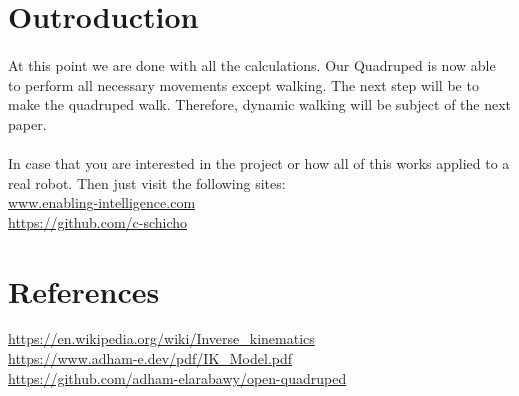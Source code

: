\documentclass{article}
\begin{document}






    \section{Outroduction}
    \paragraph{}
    At this point we are done with all the calculations. Our Quadruped is now able to perform all necessary movements except walking. The next step will be to make the quadruped walk. Therefore, dynamic walking will be subject of the next paper.
    \paragraph{}
    In case that you are interested in the project or how all of this works applied to a real robot. Then just visit the following sites: \\
    \url{www.enabling-intelligence.com} \\
    \url{https://github.com/c-schicho}



    \section{References}
    \url{https://en.wikipedia.org/wiki/Inverse_kinematics} \\
    \url{https://www.adham-e.dev/pdf/IK_Model.pdf} \\
    \url{https://github.com/adham-elarabawy/open-quadruped}
\end{document}
